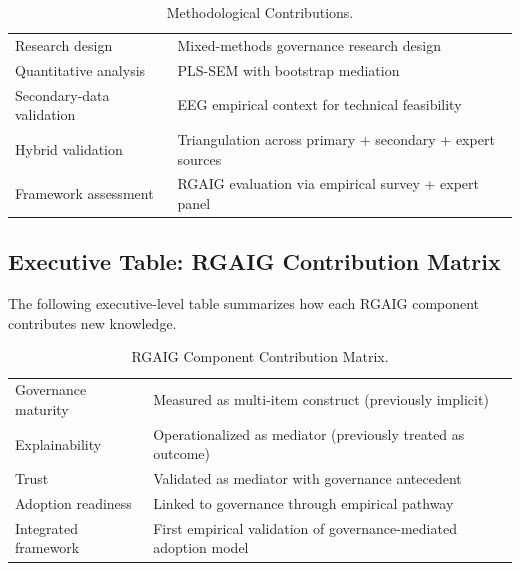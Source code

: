 {\tablestripes\tablefontsize
{}
\begin{xltabular}{\textwidth}{@{} >{\raggedright\arraybackslash}p{6cm} L @{}}
\caption[Methodological Contributions]{Methodological Contributions.}\label{tab:exec_methodological_contribution} \\
\toprule
{} &  \\
\midrule
\endfirsthead
\endhead
\bottomrule
\endlastfoot
Research design & Mixed-methods governance research design \\
\addlinespace
Quantitative analysis & PLS-SEM with bootstrap mediation \\
\addlinespace
Secondary-data validation & EEG empirical context for technical feasibility \\
\addlinespace
Hybrid validation & Triangulation across primary + secondary + expert sources \\
\addlinespace
Framework assessment & RGAIG evaluation via empirical survey + expert panel \\
\end{xltabular}}


\subsection{Executive Table: RGAIG Contribution Matrix}
\label{sec:exec_rgaig_contribution_matrix}

\noindent The following executive-level table summarizes how each RGAIG component contributes new knowledge.

{\tablestripes\tablefontsize
{}
\begin{xltabular}{\textwidth}{@{} >{\raggedright\arraybackslash}p{6cm} L @{}}
\caption[RGAIG Component Contribution Matrix]{RGAIG Component Contribution Matrix.}\label{tab:exec_rgaig_contribution_matrix} \\
\toprule
{} &  \\
\midrule
\endfirsthead
\endhead
\bottomrule
\endlastfoot
Governance maturity & Measured as multi-item construct (previously implicit) \\
\addlinespace
Explainability & Operationalized as mediator (previously treated as outcome) \\
\addlinespace
Trust & Validated as mediator with governance antecedent \\
\addlinespace
Adoption readiness & Linked to governance through empirical pathway \\
\addlinespace
Integrated framework & First empirical validation of governance-mediated adoption model \\
\end{xltabular}}


